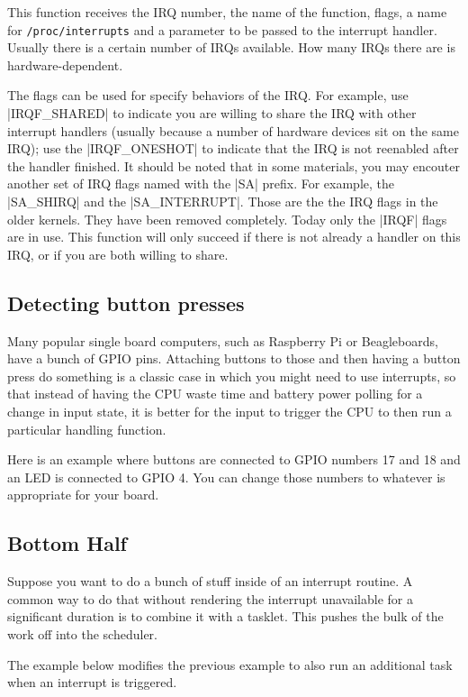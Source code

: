 \documentclass[10pt, oneside]{book}
\begin{document}
This function receives the IRQ number, the name of the function, flags, a name for \verb|/proc/interrupts| and a parameter to be passed to the interrupt handler.
Usually there is a certain number of IRQs available.
How many IRQs there are is hardware-dependent.

The flags can be used for specify behaviors of the IRQ.
For example, use \cpp|IRQF_SHARED| to indicate you are willing to share the IRQ with other interrupt handlers (usually because a number of hardware devices sit on the same IRQ); use the \cpp|IRQF_ONESHOT| to indicate that the IRQ is not reenabled after the handler finished.
It should be noted that in some materials, you may encouter another set of IRQ flags named with the \cpp|SA| prefix.
For example, the \cpp|SA_SHIRQ| and the \cpp|SA_INTERRUPT|.
Those are the the IRQ flags in the older kernels.
They have been removed completely.
Today only the \cpp|IRQF| flags are in use.
This function will only succeed if there is not already a handler on this IRQ, or if you are both willing to share.

\subsection{Detecting button presses}
\label{sec:detect_button}
Many popular single board computers, such as Raspberry Pi or Beagleboards, have a bunch of GPIO pins.
Attaching buttons to those and then having a button press do something is a classic case in which you might need to use interrupts,
so that instead of having the CPU waste time and battery power polling for a change in input state, it is better for the input to trigger the CPU to then run a particular handling function.

Here is an example where buttons are connected to GPIO numbers 17 and 18 and an LED is connected to GPIO 4.
You can change those numbers to whatever is appropriate for your board.


\subsection{Bottom Half}
\label{sec:bottom_half}
Suppose you want to do a bunch of stuff inside of an interrupt routine.
A common way to do that without rendering the interrupt unavailable for a significant duration is to combine it with a tasklet.
This pushes the bulk of the work off into the scheduler.

The example below modifies the previous example to also run an additional task when an interrupt is triggered.
\end{document}
